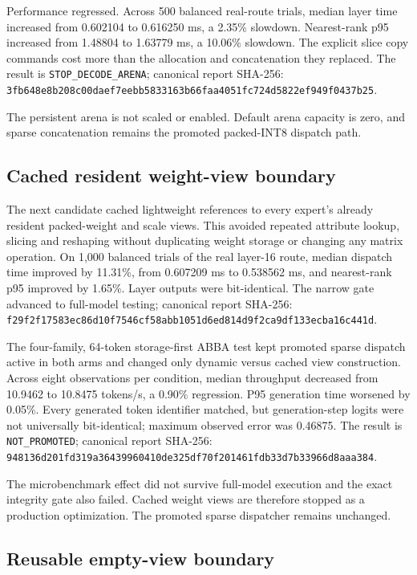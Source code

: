 Performance regressed. Across 500 balanced real-route trials, median layer time
increased from 0.602104 to 0.616250 ms, a 2.35\% slowdown. Nearest-rank p95
increased from 1.48804 to 1.63779 ms, a 10.06\% slowdown. The explicit slice
copy commands cost more than the allocation and concatenation they replaced.
The result is \texttt{STOP\_DECODE\_ARENA}; canonical report SHA-256:
\texttt{3fb648e8b208c00daef7eebb5833163b66faa4051fc724d5822ef949f0437b25}.

The persistent arena is not scaled or enabled. Default arena capacity is zero,
and sparse concatenation remains the promoted packed-INT8 dispatch path.

\subsection{Cached resident weight-view boundary}

The next candidate cached lightweight references to every expert's already
resident packed-weight and scale views. This avoided repeated attribute lookup,
slicing and reshaping without duplicating weight storage or changing any matrix
operation. On 1,000 balanced trials of the real layer-16 route, median dispatch
time improved by 11.31\%, from 0.607209 ms to 0.538562 ms, and nearest-rank p95
improved by 1.65\%. Layer outputs were bit-identical. The narrow gate advanced
to full-model testing; canonical report SHA-256:
\texttt{f29f2f17583ec86d10f7546cf58abb1051d6ed814d9f2ca9df133ecba16c441d}.

The four-family, 64-token storage-first ABBA test kept promoted sparse dispatch
active in both arms and changed only dynamic versus cached view construction.
Across eight observations per condition, median throughput decreased from
10.9462 to 10.8475 tokens/s, a 0.90\% regression. P95 generation time worsened
by 0.05\%. Every generated token identifier matched, but generation-step logits
were not universally bit-identical; maximum observed error was 0.46875. The
result is \texttt{NOT\_PROMOTED}; canonical report SHA-256:
\texttt{948136d201fd319a36439960410de325df70f201461fdb33d7b33966d8aaa384}.

The microbenchmark effect did not survive full-model execution and the exact
integrity gate also failed. Cached weight views are therefore stopped as a
production optimization. The promoted sparse dispatcher remains unchanged.

\subsection{Reusable empty-view boundary}

